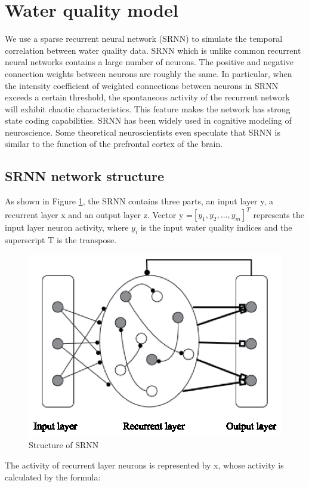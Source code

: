 \documentclass[runningheads]{llncs}
\begin{document}
\section{Water quality model}
We use a sparse recurrent neural network (SRNN)
to simulate the temporal correlation between water quality data. 
SRNN which is unlike common recurrent neural networks contains a 
large number of neurons. The positive and negative connection 
weights between neurons are roughly the same. In particular, 
when the intensity coefficient of weighted connections between 
neurons in SRNN exceeds a certain threshold, the spontaneous activity 
of the recurrent network will exhibit chaotic characteristics\cite{RN17}. 
This feature makes the network has strong state coding capabilities. 
SRNN has been widely used in cognitive modeling of neuroscience. 
Some theoretical neuroscientists even speculate that SRNN is similar 
to the function of the prefrontal cortex of the brain\cite{RN18}.
\subsection{SRNN network structure}
As shown in Figure \ref{Structure of SRNN}, 
the SRNN contains three parts, an input layer y, a recurrent layer x and an output layer z.
Vector y =$\left[y_1,y_2,...,y_m\right]^T$ represents the input layer neuron activity,
 where $y_i$ is the input water quality indices and the superscript T is the transpose.

\begin{figure}[htbp]
\centering
\includegraphics[width=0.7\columnwidth]{Fig1_structure_of_SRNN}
\caption{Structure of SRNN}
\label{Structure of SRNN}
\end{figure}

The activity of recurrent layer neurons is represented by x, 
whose activity is calculated by the formula:
\end{document}
